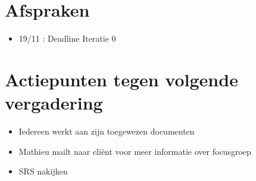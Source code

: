 \section{Afspraken}
\begin{itemize}
\item 19/11 : Deadline Iteratie 0
\end{itemize}

\section{Actiepunten tegen volgende vergadering}
\begin{itemize}
\item Iedereen werkt aan zijn toegewezen documenten 
\item Mathieu mailt naar cliënt voor meer informatie over focusgroep
\item SRS nakijken
\end{itemize}

